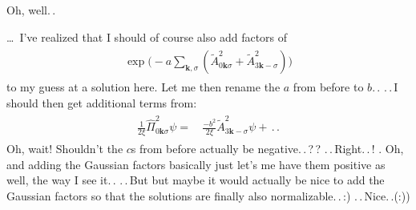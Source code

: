 \documentclass{report}
\begin{document}
Oh, well.\,. %


\ldots\ I've realized that I should of course also add factors of 
\begin{align}
\begin{aligned}
	\exp\Big(
		- a \sum_{\boldsymbol{k}, \sigma} %
		(\tilde A_{0\boldsymbol{k}\sigma}^2 + 
		\tilde A_{3\boldsymbol{k}-\sigma}^2 )
	\Big)
\end{aligned}
\end{align}
to my guess at a solution here. Let me then rename the $a$ from before to $b$.\,. .\,.\,I should then get additional terms from:
\begin{align}
\begin{aligned}
	\frac{1}{2\xi} \hat \Pi_{0\boldsymbol{k}\sigma}^2 
	\psi =&\,
	\frac{-b^2}{2\xi} \tilde A_{3\boldsymbol{k}-\sigma}^2 
	\psi
	+
	\,.\,.
\end{aligned}
\end{align}
Oh, wait! Shouldn't the $c$s from before actually be negative.\,.\,?\,? .\,.\,Right.\,.\,! .\,\,Oh, and adding the Gaussian factors basically just let's me have them positive as well, the way I see it.\,. %
.\,.\,But but maybe it would actually be nice to add the Gaussian factors so that the solutions are finally also normalizable.\,.\,:) .\,.\,Nice.\,.(:)) 
\end{document}
